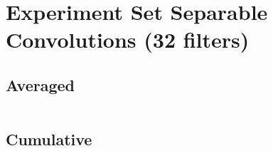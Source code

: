 \documentclass{article}%
\begin{document}
%
\normalsize%
\section{Experiment Set Separable Convolutions (32 filters)}%
\label{sec:Experiment Set Separable Convolutions (32 filters)}%
\subsection{Averaged}%
\label{subsec:Averaged}%
\begin{tabular}{|r|c|}%
\hline%
\end{tabular}

%
\subsection{Cumulative}%
\label{subsec:Cumulative}%
\begin{tabular}{|r|c|}%
\hline%
\end{tabular}

%
\end{document}
